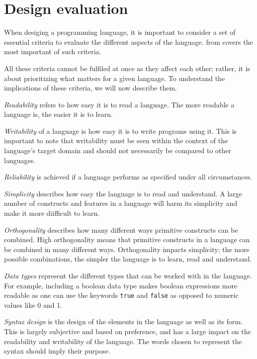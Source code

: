 \section{Design evaluation} \label{chap:design evaluation}
When desiging a programming language, it is important to consider a set of essential criteria to evaluate the different aspects of the language.
 from \cite{sebesta_concepts_2016} covers the most important of such criteria.


All these criteria cannot be fulfiled at once as they affect each other; rather, it is about prioritizing what matters for a given language. 
To understand the implications of these criteria, we will now describe them.

\textit{Readability} refers to how easy it is to read a language.
The more readable a language is, the easier it is to learn.

\textit{Writability} of a language is how easy it is to write programs using it.
This is important to note that writability must be seen within the context of the language's target domain and should not necessarily be compared to other languages.

\textit{Reliability} is achieved if a language performs as specified under all circumstances.

\textit{Simplicity} describes how easy the language is to read and understand. 
A large number of constructs and features in a language will harm its simplicity and make it more diifficult to learn.

\textit{Orthogonality} describes how many different ways primitive constructs can be combined. 
High orthogonality means that primitive constructs in a language can be combined in many different ways. 
Orthogonality impacts simplicity; the more possible combinations, the simpler the language is to learn, read and understand.

\textit{Data types} represent the different types that can be worked with in the language. 
For example, including a boolean data type makes boolean expressions more readable as one can use the keywords \texttt{true} and \texttt{false} as opposed to numeric values like 0 and 1. 

\textit{Syntax design} is the design of the elements in the language as well as its form. 
This is largely subjective and based on preference, and has a large impact on the readability and writability of the language. 
The words chosen to represent the syntax should imply their purpose. 

